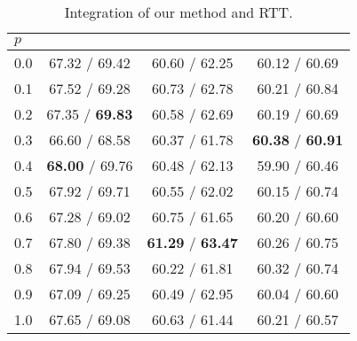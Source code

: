 \documentclass[11pt]{article}
\begin{document}
\begin{table}[t]
	\scriptsize
	\centering
	\tabcolsep 4pt
	\begin{tabular}{lccc}
		\hline
		$p$
		& \hspace{-1em}{$\def\arraystretch{0.5}\begin{array}{c}\vspace{-0.5em}\\\text{BEA-19}\\\text{test}\\\end{array}$}\hspace{-1em}
		& \hspace{-1em}{$\def\arraystretch{0.5}\begin{array}{c}\vspace{-0.5em}\\\text{CoNLL}\\\text{14}\\\end{array}$}\hspace{-1em}
		& \hspace{-1em}{$\def\arraystretch{0.5}\begin{array}{c}\vspace{-0.5em}\\\text{JFLEG}\\\text{test}\\\end{array}$}\hspace{-1em}
		\\ \hline
		0.0
		& 67.32 / 69.42
		& 60.60 / 62.25
		& 60.12 / 60.69 \\
		0.1
		& 67.52 / 69.28
		& 60.73 / 62.78
		& 60.21 / 60.84 \\
		0.2
		& 67.35 / \textbf{69.83}
		& 60.58 / 62.69
		& 60.19 / 60.69 \\
		0.3
		& 66.60 / 68.58
		& 60.37 / 61.78
		& \textbf{60.38} / \textbf{60.91} \\
		0.4
		& \textbf{68.00} / 69.76
		& 60.48 / 62.13
		& 59.90 / 60.46 \\
		0.5
		& 67.92 / 69.71
		& 60.55 / 62.02
		& 60.15 / 60.74 \\
		0.6
		& 67.28 / 69.02
		& 60.75 / 61.65
		& 60.20 / 60.60 \\
		0.7
		& 67.80 / 69.38
		& \textbf{61.29} / \textbf{63.47}
		& 60.26 / 60.75 \\
		0.8
		& 67.94 / 69.53
		& 60.22 / 61.81
		& 60.32 / 60.74 \\
		0.9
		& 67.09 / 69.25
		& 60.49 / 62.95
		& 60.04 / 60.60 \\
		1.0
		& 67.65 / 69.08
		& 60.63 / 61.44
		& 60.21 / 60.57 \\
		\hline
	\end{tabular}
	\caption{Integration of our method and RTT.}
	\label{tab:integrate}
\end{table}
\end{document}
